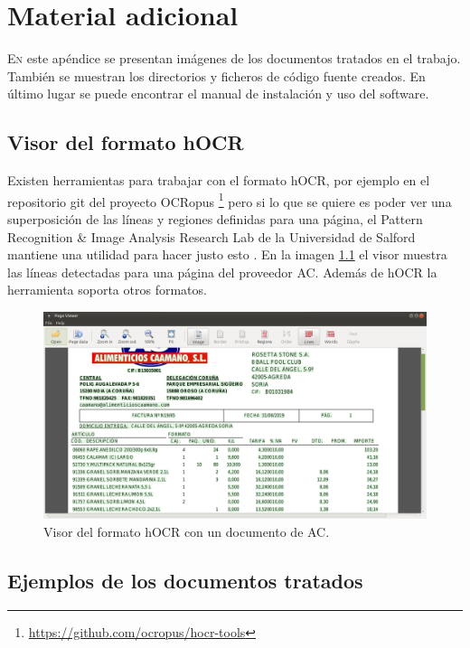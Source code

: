 
\chapter{Material adicional}
\label{chap:adicional-1}

\lettrine{E}{n} este apéndice se presentan imágenes de los documentos tratados en el trabajo. También se muestran los directorios y ficheros de código fuente creados. En último lugar se puede encontrar el manual de instalación y uso del software.


\section{Visor del formato hOCR}

Existen herramientas para trabajar con el formato hOCR, por ejemplo en el repositorio git del proyecto OCRopus \footnote{\url{https://github.com/ocropus/hocr-tools}} pero si lo que se quiere es poder ver una superposición de las líneas y regiones definidas para una página, el Pattern Recognition \& Image Analysis Research Lab de la Universidad de Salford mantiene una utilidad para hacer justo esto \cite{prima_tool_page_viewer}. En la imagen \ref{fig:visor-formato-hocr} el visor muestra las líneas detectadas para una página del proveedor AC. Además de hOCR la herramienta soporta otros formatos.

\begin{figure}[hp!]
    \centering
    \includegraphics[width=1.0\textwidth]{imaxes/z-adicional/visor-hocr.png}
    \caption{Visor del formato hOCR con un documento de AC.}
    \label{fig:visor-formato-hocr}
\end{figure}


\section{Ejemplos de los documentos tratados}

